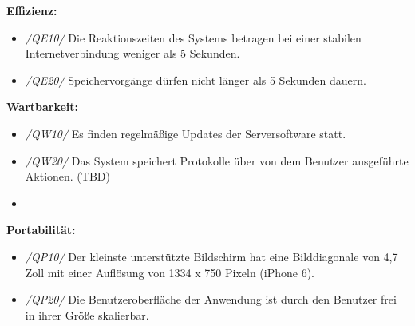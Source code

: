 \vspace{0.5cm}
\textbf{Effizienz:}
\begin{itemize}
    \item[] \emph{/QE10/} Die Reaktionszeiten des Systems betragen bei einer stabilen Internetverbindung weniger als 5 Sekunden.
    \item[] \emph{/QE20/} Speichervorgänge dürfen nicht länger als 5 Sekunden dauern.  
\end{itemize} 
\vspace{0.5cm}
\textbf{Wartbarkeit:}
\begin{itemize}
    \item[] \emph{/QW10/} Es finden regelmäßige Updates der Serversoftware statt.
    \item[] \emph{/QW20/} Das System speichert Protokolle über von dem Benutzer ausgeführte Aktionen. (TBD) 
    \item[] 
\end{itemize}
\vspace{0.5cm}
\textbf{Portabilität:}
\begin{itemize}
    \item[] \emph{/QP10/} Der kleinste unterstützte Bildschirm hat eine Bilddiagonale von 4,7 Zoll mit einer Auflösung von 1334 x 750 Pixeln (iPhone 6).
    \item[] \emph{/QP20/} Die Benutzeroberfläche der Anwendung ist durch den Benutzer frei in ihrer Größe skalierbar.
\end{itemize}

